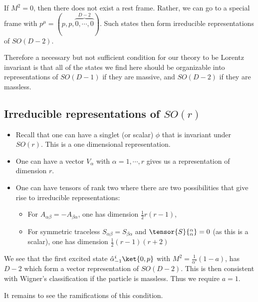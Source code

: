 If $M^2 = 0$, then there does not exist a rest frame. Rather, we can go to a special frame with $p^{\mu}= \left( p, p, \overbrace{0,\cdots,0}^{D-2} \right)$. Such states then form irreducible representations of $SO \left( D-2 \right) $. 

Therefore a necessary but not sufficient condition for our theory to be Lorentz invariant is that all of the states we find here should be organizable into representations of $SO \left( D - 1 \right) $ if they are massive, and $SO \left( D - 2 \right) $ if they are massless.

\subsection{Irreducible representations of $SO \left( r \right) $}

\begin{itemize}
    \item Recall that one can have a singlet (or scalar) $\phi$ that is invariant under $SO \left( r \right) $. This is a one dimensional representation.
    \item One can have a vector $V_\alpha$ with $\alpha = 1,\cdots, r$ gives us a representation of dimension $r$.
    \item One can have tensors of rank two where there are two possibilities that give rise to irreducible representations:
        \begin{itemize}
            \item For $A_{\alpha \beta} = - A_{\beta \alpha}$, one has dimension $\frac{1}{2} r \left(  r - 1 \right) $,
            \item For symmetric traceless $S_{\alpha \beta} = S_{\beta \alpha}$ and $\tensor{S}{_\alpha^{\alpha}} = 0$ (as this is a scalar), one has dimension $\frac{1}{2} \left( r - 1 \right)  \left( r + 2 \right) $
        \end{itemize}
\end{itemize}

We see that the first excited state $\hat{\alpha}^{i}_{-1}\ket{0,p}$ with $M^2 = \frac{1}{\alpha'} \left(  1- a \right) $, has $D - 2$ which form a vector representation of $SO \left( D - 2 \right) $. This is then consistent with Wigner's classification if the particle is massless. Thus we require $a = 1$.

It remains to see the ramifications of this condition.








